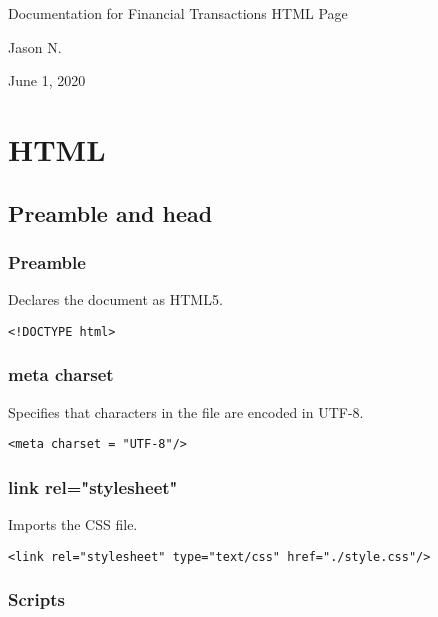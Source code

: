 \documentclass[letterpaper]{article}
\begin{document}
\vspace*{\fill}
\begin{center}
    \Large
    Documentation for Financial Transactions HTML Page

    \large
    Jason N.

    June 1, 2020
\end{center}
\vspace*{\fill}

\newpage
{}
\tableofcontents

\newpage
{}
\parskip 10pt

\section{HTML}\label{HTML}

\subsection{Preamble and head}

\subsubsection{Preamble}

Declares the document as HTML5.
\begin{lstlisting}[firstnumber=1]
<!DOCTYPE html>
\end{lstlisting}

\subsubsection{meta charset}

Specifies that characters in the file are encoded in UTF-8.
\begin{lstlisting}[firstnumber=4]
<meta charset = "UTF-8"/>
\end{lstlisting}

\subsubsection{link rel="stylesheet"}

Imports the CSS file.
\begin{lstlisting}[firstnumber=5]
<link rel="stylesheet" type="text/css" href="./style.css"/>
\end{lstlisting}

\subsubsection{Scripts}
\end{document}
